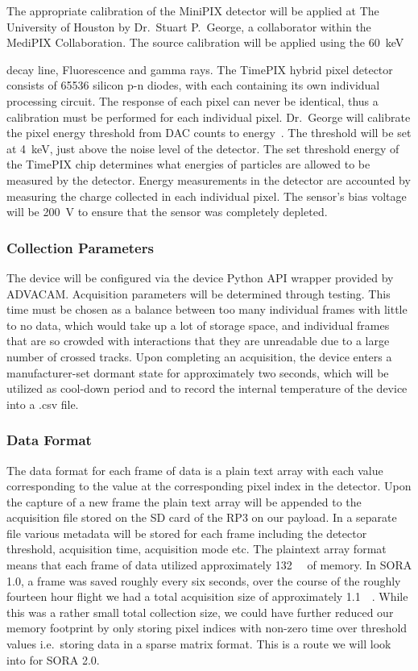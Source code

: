 The appropriate calibration of the MiniPIX detector will be applied at The University of Houston by Dr.~Stuart P.~George, a collaborator within the MediPIX Collaboration. The source calibration will be applied using the \SI{60}{\keV} { decay line,  Fluorescence and  gamma rays. The TimePIX hybrid pixel detector consists of \num{65536} silicon p-n diodes, with each containing its own individual processing circuit. The response of each pixel can never be identical, thus a calibration must be performed for each individual pixel. Dr.~George will calibrate the pixel energy threshold from DAC counts to energy~\cite{stuartthesis}. The threshold will be set at \SI{4}{\keV}, just above the noise level of the detector. The set threshold energy of the TimePIX chip determines what energies of particles are allowed to be measured by the detector. Energy measurements in the detector are accounted by measuring the charge collected in each individual pixel. The sensor's bias voltage will be \SI{200}{\volt} to ensure that the sensor was completely depleted. 
  
\subsubsection{Collection Parameters}
The device will be configured via the device Python API wrapper provided by ADVACAM. Acquisition parameters will be determined through testing. This time must be chosen as a balance between too many individual frames with little to no data, which would take up a lot of storage space, and individual frames that are so crowded with interactions that they are unreadable due to a large number of crossed tracks. Upon completing an acquisition, the device enters a manufacturer-set dormant state for approximately two seconds, which will be utilized as cool-down period and to record the internal temperature of the device into a .csv file.

\subsubsection{Data Format}
The data format for each frame of data is a plain text array with each value corresponding to the value at the corresponding pixel index in the detector. Upon the capture of a new frame the plain text array will be appended to the acquisition file stored on the SD card of the RP\num{3} on our payload. In a separate file various metadata will be stored for each frame including the detector threshold, acquisition time, acquisition mode etc. The plaintext array format means that each frame of data utilized approximately \SI{132}{\kilo\byte} of memory. In SORA \num{1.0}, a frame was saved roughly every six seconds, over the course of the roughly fourteen hour flight we had a total acquisition size of approximately \SI{1.1}{\giga\byte}. While this was a rather small total collection size, we could have further reduced our memory footprint by only storing pixel indices with non-zero time over threshold values i.e.\ storing data in a sparse matrix format. This is a route we will look into for SORA \num{2.0}.
}
